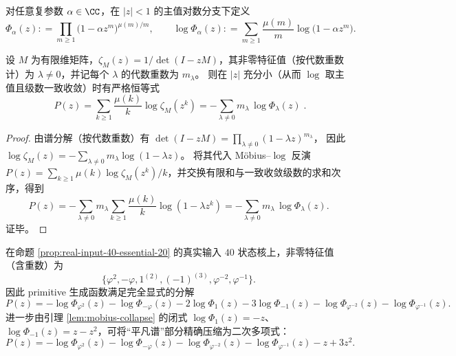 \begin{definition}\label{def:mu-pochhammer}
对任意复参数 \(\alpha\in\CC\)，在 \(|z|<1\) 的主值对数分支下定义
\[
\Phi_\alpha(z)
:\!=\prod_{m\ge 1}\bigl(1-\alpha z^m\bigr)^{\mu(m)/m},
\qquad
\log\Phi_\alpha(z)
:\!=\sum_{m\ge 1}\frac{\mu(m)}{m}\log\bigl(1-\alpha z^m\bigr).
\]
\end{definition}

\begin{proposition}\label{prop:mu-pochhammer-decomposition}
设 \(M\) 为有限维矩阵，\(\zeta_M(z)=1/\det(I-zM)\)，其非零特征值（按代数重数计）为 \(\lambda\neq 0\)，并记每个 \(\lambda\) 的代数重数为 \(m_\lambda\)。
则在 \(|z|\) 充分小（从而 \(\log\) 取主值且级数一致收敛）时有严格恒等式
\[
\boxed{\;
P(z)
=\sum_{k\ge 1}\frac{\mu(k)}{k}\log\zeta_M(z^k)
=-\sum_{\lambda\neq 0}m_\lambda\,\log\Phi_\lambda(z)\; }.
\]
\end{proposition}
\begin{proof}
由谱分解（按代数重数）有
\(
\det(I-zM)=\prod_{\lambda\neq 0}(1-\lambda z)^{m_\lambda}
\)，
因此
\(
\log\zeta_M(z)
=-\sum_{\lambda\neq 0}m_\lambda\log(1-\lambda z)
\)。
将其代入 Möbius--$\log$ 反演
\(
P(z)=\sum_{k\ge 1}\mu(k)\log\zeta_M(z^k)/k
\)，并交换有限和与一致收敛级数的求和次序，得到
\[
P(z)
=-\sum_{\lambda\neq 0}m_\lambda\sum_{k\ge 1}\frac{\mu(k)}{k}\log(1-\lambda z^k)
=-\sum_{\lambda\neq 0}m_\lambda\,\log\Phi_\lambda(z).
\]
证毕。
\end{proof}



\begin{corollary}\label{cor:real-input-40-mu-pochhammer-explicit}
在命题 \ref{prop:real-input-40-essential-20} 的真实输入 \(40\) 状态核上，非零特征值（含重数）为
\[
\{\varphi^2,-\varphi,1^{(2)},(-1)^{(3)},\varphi^{-2},\varphi^{-1}\}.
\]
因此 primitive 生成函数满足完全显式的分解
\[
\boxed{
P(z)=
-\log\Phi_{\varphi^2}(z)
-\log\Phi_{-\varphi}(z)
-2\log\Phi_{1}(z)
-3\log\Phi_{-1}(z)
-\log\Phi_{\varphi^{-2}}(z)
-\log\Phi_{\varphi^{-1}}(z).
}
\]
进一步由引理 \ref{lem:mobius-collapse} 的闭式 \(\log\Phi_{1}(z)=-z\)、\(\log\Phi_{-1}(z)=z-z^2\)，可将“平凡谱”部分精确压缩为二次多项式：
\[
\boxed{
P(z)=
-\log\Phi_{\varphi^2}(z)
-\log\Phi_{-\varphi}(z)
-\log\Phi_{\varphi^{-2}}(z)
-\log\Phi_{\varphi^{-1}}(z)
-z+3z^2.
}
\]
\end{corollary}

